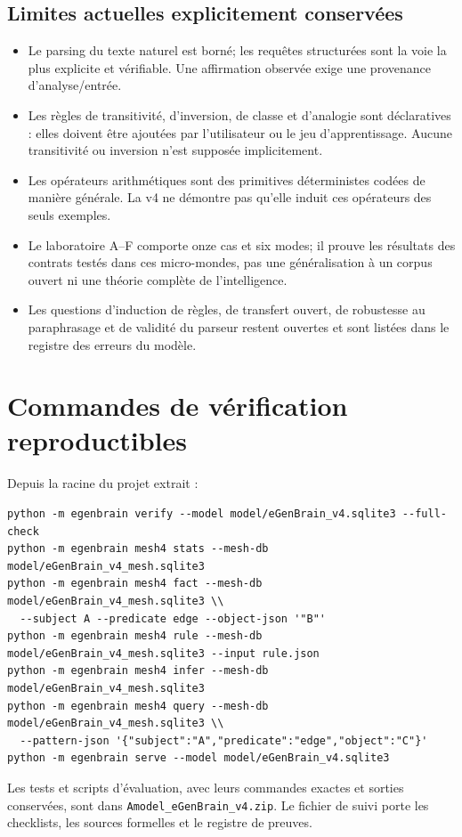 \documentclass[11pt,a4paper]{book}
\begin{document}
\section{Limites actuelles explicitement conservées}
\begin{itemize}
\item Le parsing du texte naturel est borné; les requêtes structurées sont la voie la plus explicite et vérifiable. Une affirmation observée exige une provenance d'analyse/entrée.
\item Les règles de transitivité, d'inversion, de classe et d'analogie sont déclaratives : elles doivent être ajoutées par l'utilisateur ou le jeu d'apprentissage. Aucune transitivité ou inversion n'est supposée implicitement.
\item Les opérateurs arithmétiques sont des primitives déterministes codées de manière générale. La v4 ne démontre pas qu'elle induit ces opérateurs des seuls exemples.
\item Le laboratoire A--F comporte onze cas et six modes; il prouve les résultats des contrats testés dans ces micro-mondes, pas une généralisation à un corpus ouvert ni une théorie complète de l'intelligence.
\item Les questions d'induction de règles, de transfert ouvert, de robustesse au paraphrasage et de validité du parseur restent ouvertes et sont listées dans le registre des erreurs du modèle.
\end{itemize}

\chapter{Commandes de vérification reproductibles}
Depuis la racine du projet extrait :
\begin{verbatim}
python -m egenbrain verify --model model/eGenBrain_v4.sqlite3 --full-check
python -m egenbrain mesh4 stats --mesh-db model/eGenBrain_v4_mesh.sqlite3
python -m egenbrain mesh4 fact --mesh-db model/eGenBrain_v4_mesh.sqlite3 \\
  --subject A --predicate edge --object-json '"B"'
python -m egenbrain mesh4 rule --mesh-db model/eGenBrain_v4_mesh.sqlite3 --input rule.json
python -m egenbrain mesh4 infer --mesh-db model/eGenBrain_v4_mesh.sqlite3
python -m egenbrain mesh4 query --mesh-db model/eGenBrain_v4_mesh.sqlite3 \\
  --pattern-json '{"subject":"A","predicate":"edge","object":"C"}'
python -m egenbrain serve --model model/eGenBrain_v4.sqlite3
\end{verbatim}
Les tests et scripts d'évaluation, avec leurs commandes exactes et sorties conservées, sont dans \texttt{Amodel\_eGenBrain\_v4.zip}. Le fichier de suivi porte les checklists, les sources formelles et le registre de preuves.
\end{document}

